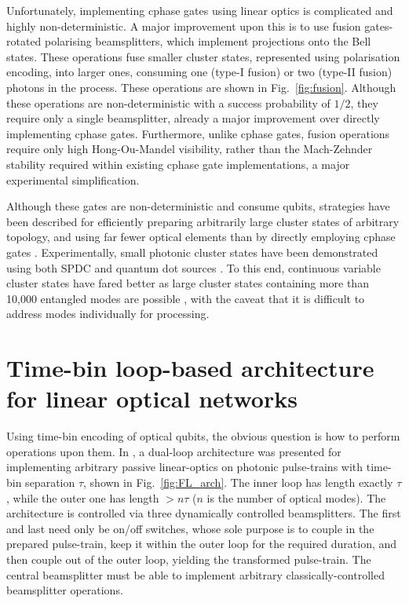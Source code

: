 \documentclass[times,final]{elsarticle}
\begin{document}
Unfortunately, implementing {\sc cphase} gates using linear optics is complicated and highly non-deterministic. A major improvement upon this is to use fusion gates-rotated polarising beamsplitters, which implement projections onto the Bell states. These operations fuse smaller cluster states, represented using polarisation encoding, into larger ones, consuming one (type-I fusion) or two (type-II fusion) photons in the process. These operations are shown in Fig.~\ref{fig:fusion}. Although these operations are non-deterministic with a success probability of $1/2$, they require only a single beamsplitter, already a major improvement over directly implementing {\sc cphase} gates. Furthermore, unlike {\sc cphase} gates, fusion operations require only high Hong-Ou-Mandel visibility, rather than the Mach-Zehnder stability required within existing {\sc cphase} gate implementations, a major experimental simplification.

Although these gates are non-deterministic and consume qubits, strategies have been described for efficiently preparing arbitrarily large cluster states of arbitrary topology, and using far fewer optical elements than by directly employing {\sc cphase} gates \cite{bib:Nielsen04,bib:BrowneRudolph05,bib:Gimeno-Segovia15,bib:Pant17}. Experimentally, small photonic cluster states have been demonstrated using both SPDC \cite{bib:Walther05a,bib:Lu06,bib:Prevedel07,bib:Tokunaga08} and quantum dot sources \cite{bib:Schwartz16}. To this end, continuous variable cluster states have fared better as large cluster states containing more than 10,000 entangled modes are possible  \cite{bib:Yokoyama13}, with the caveat that it is difficult to address modes individually for processing.



\section{Time-bin loop-based architecture for linear optical networks}\label{sec:timebins}

Using time-bin encoding of optical qubits, the obvious question is how to perform operations upon them. In \cite{bib:Motes14}, a dual-loop architecture was presented for implementing arbitrary passive linear-optics on photonic pulse-trains with time-bin separation $\tau$, shown in Fig.~\ref{fig:FL_arch}. The inner loop has length exactly $\tau$, while the outer one has length $>n\tau$ ($n$ is the 
number of optical modes). The architecture is controlled via three 
dynamically controlled beamsplitters. The first and last need only be on/off switches, whose sole purpose is to couple in the prepared pulse-train, 
keep it within the outer loop for the required duration, and then couple 
out of the outer loop, yielding the transformed pulse-train. The central 
beamsplitter must be able to implement arbitrary classically-controlled 
beamsplitter operations.
\end{document}
